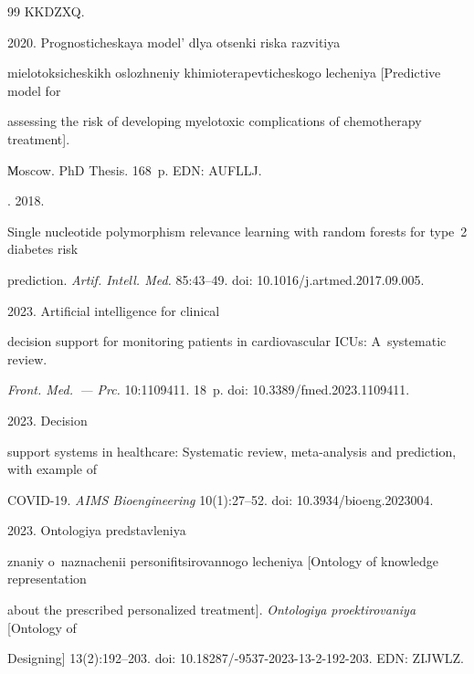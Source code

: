 {{\begin{thebibliography}{99}
KKDZXQ.


    2020. Prognosticheskaya model' dlya otsenki riska razvitiya 

mielotoksicheskikh oslozhneniy khimioterapevticheskogo lecheniya [Predictive model for 

assessing the risk of developing myelotoxic complications of chemotherapy treatment].  

Мoscow. PhD Thesis. 168~p. EDN: AUFLLJ.


   . 2018. 

Single nucleotide polymorphism relevance learning with random forests for type~2 diabetes risk 

prediction. \textit{Artif. Intell. Med.} 85:43--49. doi: 10.1016\!/\!j.artmed.2017.09.005.


    2023. Artificial intelligence for clinical 

decision support for monitoring patients in cardiovascular ICUs: A~systematic review. 

\textit{Front. Med.~--- Prc.} 10:1109411. 18~p. doi: 10.3389\!/\!fmed.2023.1109411.


    2023. Decision 

support systems in healthcare: Systematic review, meta-analysis and prediction, with example of 

COVID-19. \textit{AIMS Bioengineering} 10(1):27--52. doi: 10.3934\!/\!bioeng.2023004.


    2023. Ontologiya predstavleniya 

znaniy o~naznachenii personifitsirovannogo lecheniya [Ontology of knowledge representation 

about the prescribed personalized treatment]. \textit{Ontologiya proektirovaniya} [Ontology of 

Designing] 13(2):192--203. doi: 10.18287\!/-9537-2023-13-2-192-203. EDN: ZIJWLZ.



\end{thebibliography}}}
